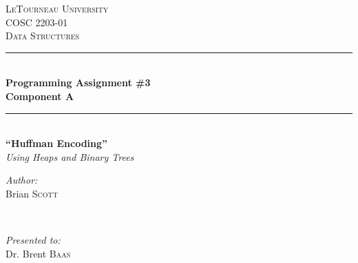 \begin{titlepage}
\newcommand{\HRule}{\rule{\linewidth}{0.5mm}} %

\center %
 

\textsc{\LARGE LeTourneau University}\\[1.0cm] %
\textsc{\Large COSC 2203-01}\\[0.5cm] %
\textsc{\large Data Structures}\\[0.5cm] %


\HRule \\[0.4cm]
{ \huge \bfseries Programming Assignment \#3\\Component A}\\[0.2cm] %
\HRule \\[1.5cm]
 

{\Large\bfseries ``Huffman Encoding''}\\[5mm]
{\Large \emph{Using Heaps and Binary Trees}} \\[1.5cm]


\begin{minipage}{0.35\textwidth}
	\begin{flushleft} \large
		\emph{Author:}\\
		Brian \textsc{Scott} %
	\end{flushleft}
\end{minipage}
~
\begin{minipage}{0.35\textwidth}
	\begin{flushright} \large
		\emph{Presented to:} \\
		Dr. Brent \textsc{Baas} %
	\end{flushright}
\end{minipage}\\[4cm]


\end{titlepage}
